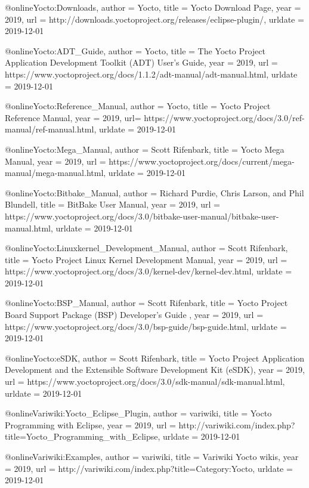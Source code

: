 @online{Yocto:Downloads,
author = {Yocto},
title = {{Yocto} Download Page},
year = 2019,
url = {http://downloads.yoctoproject.org/releases/eclipse-plugin/},
urldate = {2019-12-01}
}


@online{Yocto:ADT_Guide,
author = {Yocto},
title = {The Yocto Project Application Development Toolkit (ADT) User's Guide},
year = 2019,
url = {https://www.yoctoproject.org/docs/1.1.2/adt-manual/adt-manual.html},
urldate = {2019-12-01}
}


@online{Yocto:Reference_Manual,
author = {Yocto},
title = {Yocto Project Reference Manual},
year = 2019,
url= {https://www.yoctoproject.org/docs/3.0/ref-manual/ref-manual.html},
urldate = {2019-12-01}
}


@online{Yocto:Mega_Manual,
author = {Scott Rifenbark},
title = {Yocto Mega Manual},
year = 2019,
url = {https://www.yoctoproject.org/docs/current/mega-manual/mega-manual.html},
urldate = {2019-12-01}
}


@online{Yocto:Bitbake_Manual,
author = {Richard Purdie, Chris Larson, and Phil Blundell},
title = {BitBake User Manual},
year = 2019,
url = {https://www.yoctoproject.org/docs/3.0/bitbake-user-manual/bitbake-user-manual.html},
urldate = {2019-12-01}
}

@online{Yocto:Linuxkernel_Development_Manual,
author = {Scott Rifenbark},
title = {Yocto Project Linux Kernel Development Manual},
year = 2019,
url = {https://www.yoctoproject.org/docs/3.0/kernel-dev/kernel-dev.html},
urldate = {2019-12-01}
}


@online{Yocto:BSP_Manual,
author = {Scott Rifenbark},
title = {Yocto Project Board Support Package (BSP) Developer's Guide },
year = 2019,
url = {https://www.yoctoproject.org/docs/3.0/bsp-guide/bsp-guide.html},
urldate = {2019-12-01}
}

@online{Yocto:eSDK,
author = {Scott Rifenbark},
title = {Yocto Project Application Development and the Extensible Software Development Kit (eSDK)},
year = 2019,
url = {https://www.yoctoproject.org/docs/3.0/sdk-manual/sdk-manual.html},
urldate = {2019-12-01}
}

@online{Variwiki:Yocto_Eclipse_Plugin,
author = {variwiki},
title = {Yocto Programming with Eclipse},
year = 2019,
url = {http://variwiki.com/index.php?title=Yocto_Programming_with_Eclipse},
urldate = {2019-12-01}
}

@online{Variwiki:Examples,
author = {variwiki},
title = {Variwiki Yocto wikis},
year = 2019,
url = {http://variwiki.com/index.php?title=Category:Yocto},
urldate = {2019-12-01}
}


